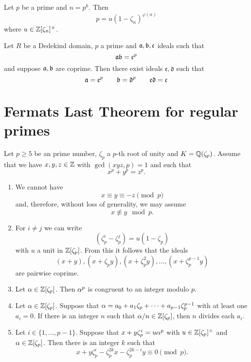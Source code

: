 \begin{lemma}\label{lemma:fac_of_p_in_p_th_root}
	Let $p$ be a prime and $n=p^k$. Then \[p=u(1-\zeta_n)^{\varphi(n)}\] where $u \in \mathbb{Z}[\zeta_n]^{\times}$.
\end{lemma}

\begin{lemma}\label{lemma:ideals_mult_to_power}
	Let $R$ be a Dedekind domain, $p$ a prime and $\mathfrak{a},\mathfrak{b},\mathfrak{c}$ ideals such that \[\mathfrak{a}\mathfrak{b}=\mathfrak{c}^p\] and suppose $\mathfrak{a},\mathfrak{b}$ are coprime. Then there exist ideals $\mathfrak{e},\mathfrak{d}$ such that \[\mathfrak{a}=\mathfrak{e}^p \qquad \mathfrak{b}=\mathfrak{d}^p \qquad \mathfrak{e}\mathfrak{d}=\mathfrak{c}\]
\end{lemma}


\section{Fermats Last Theorem for regular primes}

\begin{theorem}\label{theorem:FLT_facts}

	Let $p \geq 5$ be an prime number, $\zeta_p$ a $p$-th root of unity and $K=\mathbb{Q}(\zeta_p)$.  Assume that we have $x,y,z \in \mathbb{Z}$ with $\gcd(xyz,p)=1$ and such that \[x^p+y^p=z^p.\]

	\begin{enumerate}
		\item We cannot have  \[x \equiv y \equiv -z \pmod p\] and, therefore, without loss of generality, we may assume \[x \not \equiv y \mod p.\]

		\item For $i \neq j$ we can write \[(\zeta_p^i-\zeta_p^j)=u(1-\zeta_p)\] with $u$ a unit in $\mathbb{Z}[\zeta_p]$. From this it follows that the ideals \[(x+y),(x+\zeta_py),(x+\zeta_p^2y),\dots,(x+\zeta_p^{p-1}y)\] are pairwise coprime.

		\item Let $\alpha \in \mathbb{Z}[\zeta_p]$. Then $\alpha^p$ is congruent to an integer modulo $p$.

		\item Let $\alpha \in \mathbb{Z}[\zeta_p]$.   Suppose that $\alpha=a_0+a_1\zeta_p+\cdots+a_{p-1}\zeta_p^{p-1}$ with at least one $a_i=0$. If there is an integer $n$ such that $\alpha/n \in \mathbb{Z}[\zeta_p]$, then $n$ divides each $a_i$.


		\item   Let $i \in \{1,\dots,p-1\}.$ Suppose that $x+y\zeta_p^i=u \alpha^p$ with $u \in \mathbb{Z}[\zeta_p]^\times$ and $\alpha \in \mathbb{Z}[\zeta_p]$. Then there is an integer $k$ such that \[x+y\zeta_p^i-\zeta_p^{2k}x-\zeta_p^{2k-i}y \equiv 0 \pmod p.\]


	\end{enumerate}

\end{theorem}



